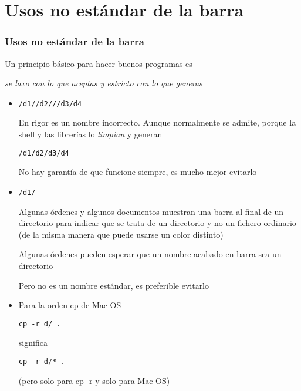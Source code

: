 \documentclass[ucs]{beamer}
\begin{document}
\section{Usos no estándar de la barra}
\begin{frame}[fragile]
\frametitle{Usos no estándar de la barra}
Un principio básico para hacer buenos programas es 

\emph{se laxo con lo que aceptas y estricto con lo que generas}
\begin{itemize}
\item
\verb|/d1//d2///d3/d4|  

En rigor es un nombre incorrecto. Aunque normalmente se admite, porque 
la shell y las librerías lo 
 \emph{limpian} y generan

\verb|/d1/d2/d3/d4|

No hay garantía de que funcione siempre, es mucho mejor evitarlo
\item

\verb|/d1/|

Algunas órdenes y algunos documentos muestran una barra al final de 
un directorio para indicar que se trata de un directorio y no un
fichero ordinario (de la misma manera que puede usarse un color distinto)

Algunas órdenes pueden esperar que un nombre acabado en barra sea un directorio
 
Pero no es un nombre estándar, es preferible evitarlo

\end{itemize}


\end{frame}
\begin{frame}[fragile]

\begin{itemize}


\item

Para la orden cp de Mac OS

\verb|cp -r d/ . |

significa

\verb|cp -r d/* .  |

(pero solo para cp -r y solo para Mac OS)
\end{itemize}
\end{frame}

\end{document}
